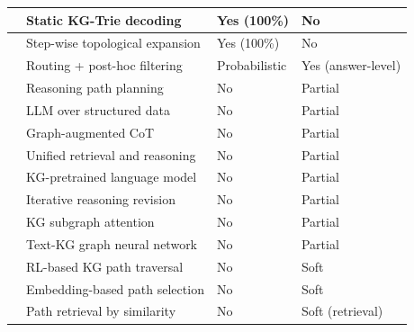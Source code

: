 \begin{longtable}[htpb]{|>{\raggedright\arraybackslash}p{3.5cm}|>{\raggedright\arraybackslash}p{4cm}|>{\raggedright\arraybackslash}p{3cm}|>{\raggedright\arraybackslash}p{3cm}|}
  \citet{luo2025-graph-constrained-reasoning} & Static KG-Trie decoding          & Yes (100\%)                      & No                             \\ \hline
  \citet{li2024-decoding-on-graphs}           & Step-wise topological expansion  & Yes (100\%)                      & No                             \\ \hline
  \citet{yuan2026routerkgqa}                  & Routing + post-hoc filtering     & Probabilistic                    & Yes (answer-level)             \\ \hline
  \citet{luo2024rog}                          & Reasoning path planning          & No                               & Partial                        \\ \hline
  \citet{jiang2023structgpt}                  & LLM over structured data         & No                               & Partial                        \\ \hline
  \citet{jin2024graphcot}                     & Graph-augmented CoT              & No                               & Partial                        \\ \hline
  \citet{jiang2022unikgqa}                    & Unified retrieval and reasoning  & No                               & Partial                        \\ \hline
  \citet{wang2021kepler}                      & KG-pretrained language model     & No                               & Partial                        \\ \hline
  \citet{mavromatis2022rearev}                & Iterative reasoning revision     & No                               & Partial                        \\ \hline
  \citet{he2021improving}                     & KG subgraph attention            & No                               & Partial                        \\ \hline
  \citet{yasunaga2021qagnn}                   & Text-KG graph neural network     & No                               & Partial                        \\ \hline
  \citet{das2017go}                           & RL-based KG path traversal       & No                               & Soft                           \\ \hline
  \citet{saxena2022kgqa}                      & Embedding-based path selection   & No                               & Soft                           \\ \hline
  \citet{shi2021kgpath}                       & Path retrieval by similarity     & No                               & Soft (retrieval)               \\ \hline

\end{longtable}
